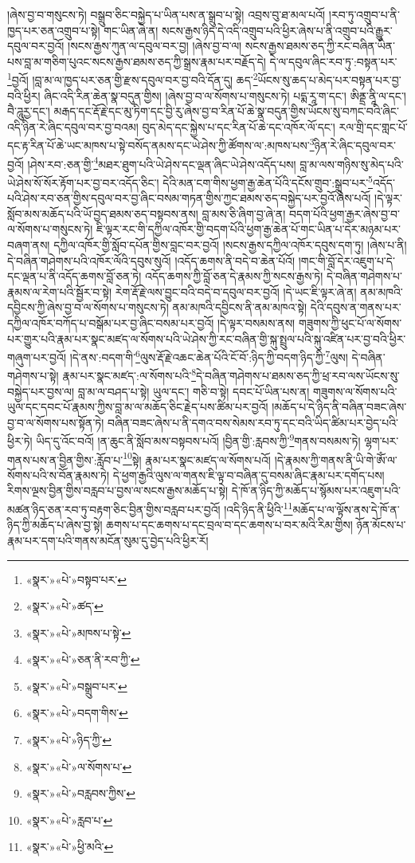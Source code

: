 །ཞེས་བྱ་བ་གསུངས་ཏེ། བསྒྲུབ་ཅིང་བསྐྱེད་པ་ཡིན་པས་ན་སྒྲུབ་པ་སྟེ། འབྲས་བུ་ཐ་མལ་པའོ། །རབ་ཏུ་འགྲུབ་པ་ནི་ཁྱད་པར་ཅན་འགྲུབ་པ་སྟེ། གང་ཡིན་ཞེ་ན། སངས་རྒྱས་ཉིད་དེ་འདི་འགྲུབ་པའི་ཕྱིར་ཞེས་པ་ནི་འགྲུབ་པའི་རྒྱུར་དབུལ་བར་བྱའོ། །སངས་རྒྱས་ཀུན་ལ་དབུལ་བར་བྱ། །ཞེས་བྱ་བ་ལ། སངས་རྒྱས་ཐམས་ཅད་ཀྱི་རང་བཞིན་ཡིན་པས་བླ་མ་གཅིག་པུའང་སངས་རྒྱས་ཐམས་ཅད་ཀྱི་སྒྲས་རྣམ་པར་བརྗོད་དེ། དེ་ལ་དབུལ་ཞིང་རབ་ཏུ་:བསྟན་པར་\footnote{«སྣར་»«པེ་»བསྟབ་པར་}བྱའོ། །བླ་མ་ལ་ཁྱད་པར་ཅན་གྱི་རྫས་དབུལ་བར་བྱ་བའི་དོན་དུ། ཆད་\footnote{«སྣར་»«པེ་»ཚད་}ཡོངས་སུ་ཆད་པ་མེད་པར་བསྟན་པར་བྱ་བའི་ཕྱིར། ཞིང་འདི་རིན་ཆེན་སྣ་བདུན་གྱིས། །ཞེས་བྱ་བ་ལ་སོགས་པ་གསུངས་ཏེ། པདྨ་རཱ་ག་དང་། ཨིནྡྲ་ནཱི་ལ་དང་། བཻ་ཌཱུརྱ་དང་། མརྒད་དང་རྡོ་རྗེ་དང་མུ་ཏིག་དང་བྱི་རུ་ཞེས་བྱ་བ་རིན་པོ་ཆེ་སྣ་བདུན་གྱིས་ཡོངས་སུ་བཀང་བའི་ཞིང་འདི་ཉིན་རེ་ཞིང་དབུལ་བར་བྱ་བའམ། བུད་མེད་དང་སྐྱེས་པ་དང་རིན་པོ་ཆེ་དང་འཁོར་ལོ་དང་། རལ་གྲི་དང་གླང་པོ་དང་རྟ་རིན་པོ་ཆེ་ཡང་མཁས་པ་སྟེ་བསོད་ནམས་དང་ཡེ་ཤེས་ཀྱི་ཚོགས་ལ་:མཁས་པས་\footnote{«སྣར་»«པེ་»མཁས་པ་སྟེ་}ཉིན་རེ་ཞིང་དབུལ་བར་བྱའོ། །ཤེས་རབ་:ཅན་གྱི་\footnote{«སྣར་»«པེ་»ཅན་ནི་རབ་ཀྱི་}མཐར་ཐུག་པའི་ཡེ་ཤེས་དང་ལྡན་ཞིང་ཡེ་ཤེས་འདོད་པས། བླ་མ་ལས་གཉིས་སུ་མེད་པའི་ཡེ་ཤེས་སོ་སོར་རྟོག་པར་བྱ་བར་འདོད་ཅིང་། དེའི་མན་ངག་གིས་ཕྱག་རྒྱ་ཆེན་པོའི་དངོས་གྲུབ་:སྒྲུབ་པར་\footnote{«སྣར་»«པེ་»བསྒྲུབ་པར་}འདོད་པའི་ཤེས་རབ་ཅན་གྱིས་དབུལ་བར་བྱ་ཞིང་བསམ་གཏན་གྱིས་ཀྱང་ཐམས་ཅད་བསྐྱེད་པར་བྱའོ་ཞེས་པའོ། །དེ་ལྟར་སློབ་མས་མཆོད་པའི་ཡོ་བྱད་ཐམས་ཅད་བསྟབས་ནས། བླ་མས་ཅི་ཞིག་བྱ་ཞེ་ན། བདག་པོའི་ཕྱག་རྒྱར་ཞེས་བྱ་བ་ལ་སོགས་པ་གསུངས་ཏེ། ཇི་ལྟར་རང་གི་དཀྱིལ་འཁོར་གྱི་བདག་པོའི་ཕྱག་རྒྱ་ཆེན་པོ་གང་ཡིན་པ་དེར་མཉམ་པར་བཞག་ནས། དཀྱིལ་འཁོར་གྱི་སློབ་དཔོན་གྱིས་བླང་བར་བྱའོ། །སངས་རྒྱས་དཀྱིལ་འཁོར་དབུས་དག་ཏུ། །ཞེས་པ་ནི། དེ་བཞིན་གཤེགས་པའི་འཁོར་ལོའི་དབུས་སུའོ། །འདོད་ཆགས་ནི་བདེ་བ་ཆེན་པོའོ། །གང་གི་བློ་དེར་འཇུག་པ་དེ་དང་ལྡན་པ་ནི་འདོད་ཆགས་བློ་ཅན་ཏེ། འདོད་ཆགས་ཀྱི་བློ་ཅན་དེ་རྣམས་ཀྱི་སངས་རྒྱས་ཏེ། དེ་བཞིན་གཤེགས་པ་རྣམས་ལ་རེག་པའི་སྦྱོར་བ་སྟེ། རེག་རྡོ་རྗེ་ལས་བྱུང་བའི་བདེ་བ་དབུལ་བར་བྱའོ། །དེ་ཡང་ཇི་ལྟར་ཞེ་ན། ནམ་མཁའི་དབྱིངས་ཀྱི་ཞེས་བྱ་བ་ལ་སོགས་པ་གསུངས་ཏེ། ནམ་མཁའི་དབྱིངས་ནི་ནམ་མཁའ་སྟེ། དེའི་དབུས་ན་གནས་པར་དཀྱིལ་འཁོར་བཀོད་པ་བསྒོམ་པར་བྱ་ཞིང་བསམ་པར་བྱའོ། །དེ་ལྟར་བསམས་ནས། གཟུགས་ཀྱི་ཕུང་པོ་ལ་སོགས་པར་གྱུར་པའི་རྣམ་པར་སྣང་མཛད་ལ་སོགས་པའི་ཡེ་ཤེས་ཀྱི་རང་བཞིན་གྱི་སྐུ་སྤྲུལ་པའི་སྐུ་འཛིན་པར་བྱ་བའི་ཕྱིར་གཞུག་པར་བྱའོ། །དེ་ནས་:བདག་གི་\footnote{«སྣར་»«པེ་»བདག་གིས་}ལུས་རྡོ་རྗེ་འཆང་ཆེན་པོའི་ངོ་བོ་:ཉིད་ཀྱི་བདག་ཉིད་ཀྱི་\footnote{«སྣར་»«པེ་»ཉིད་ཀྱི་}ལུས། དེ་བཞིན་གཤེགས་པ་སྟེ། རྣམ་པར་སྣང་མཛད་:ལ་སོགས་པའི་\footnote{«སྣར་»«པེ་»ལ་སོགས་པ་}དེ་བཞིན་གཤེགས་པ་ཐམས་ཅད་ཀྱི་ཕྲ་རབ་ལས་ཡོངས་སུ་བསྐྱེད་པར་བྱས་ལ། བླ་མ་ལ་བཤད་པ་སྟེ། ཡུལ་དང་། གཅི་བ་སྟེ། དབང་པོ་ཡིན་པས་ན། གཟུགས་ལ་སོགས་པའི་ཡུལ་དང་དབང་པོ་རྣམས་ཀྱིས་བླ་མ་ལ་མཆོད་ཅིང་རྗེད་པས་ཚིམ་པར་བྱའོ། །མཆོད་པ་དེ་ཉིད་ནི་བཞིན་བཟང་ཞེས་བྱ་བ་ལ་སོགས་པས་སྟོན་ཏེ། བཞིན་བཟང་ཞེས་པ་ནི་དགའ་བས་སེམས་རབ་ཏུ་དང་བའི་ཡིད་ཚིམ་པར་བྱེད་པའི་ཕྱིར་ཏེ། ཡིད་དུ་འོང་བའོ། །ན་ཆུང་ནི་སློབ་མས་བསྟབས་པའོ། །བྱིན་གྱི་:རླབས་ཀྱི་\footnote{«སྣར་»«པེ་»བརླབས་ཀྱིས་}གནས་བསམས་ཏེ། ལྷག་པར་གནས་པས་ན་བྱིན་གྱིས་:རློབ་པ་\footnote{«སྣར་»«པེ་»རླབ་པ་}སྟེ། རྣམ་པར་སྣང་མཛད་ལ་སོགས་པའོ། །དེ་རྣམས་ཀྱི་གནས་ནི་ཡི་གེ་ཨོཾ་ལ་སོགས་པའི་ས་བོན་རྣམས་ཏེ། དེ་ཕྱག་རྒྱའི་ལུས་ལ་གནས་ཇི་ལྟ་བ་བཞིན་དུ་བསམ་ཞིང་རྣམ་པར་དགོད་པས། རིགས་ལྔས་བྱིན་གྱིས་བརླབ་པ་བྱས་ལ་སངས་རྒྱས་མཆོད་པ་སྟེ། དེ་ཁོ་ན་ཉིད་ཀྱི་མཆོད་པ་སྙོམས་པར་འཇུག་པའི་མཚན་ཉིད་ཅན་རབ་ཏུ་བརྟག་ཅིང་བྱིན་གྱིས་བརླབ་པར་བྱའོ། །འདི་ཉིད་ནི་ཕྱིའི་\footnote{«སྣར་»«པེ་»ཕྱི་མའི་}མཆོད་པ་ལ་ལྟོས་ནས་དེ་ཁོ་ན་ཉིད་ཀྱི་མཆོད་པ་ཞེས་བྱ་སྟེ། ཆགས་པ་དང་ཆགས་པ་དང་བྲལ་བ་དང་ཆགས་པ་བར་མའི་རིམ་གྱིས། ཉོན་མོངས་པ་རྣམ་པར་དག་པའི་གནས་མངོན་སུམ་དུ་བྱེད་པའི་ཕྱིར་རོ། 